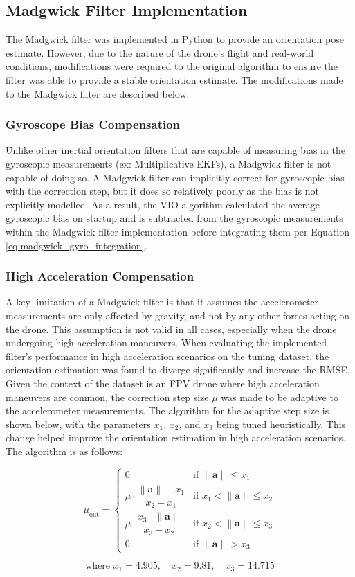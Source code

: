 \documentclass[bare_jrnl_transmag]{subfiles}
\begin{document}
\subsection{Madgwick Filter Implementation}
The Madgwick filter was implemented in Python to provide an orientation pose estimate. However, due to the nature of the drone's flight and real-world conditions, modifications were required to the original algorithm to ensure the filter was able to provide a stable orientation estimate. The modifications made to the Madgwick filter are described below. \newline

\subsubsection{Gyroscope Bias Compensation}
Unlike other inertial orientation filters that are capable of measuring bias in the gyroscopic measurements (ex: Multiplicative EKFs), a Madgwick filter is not capable of doing so. A Madgwick filter can implicitly correct for gyroscopic bias with the correction step, but it does so relatively poorly as the bias is not explicitly modelled. As a result, the VIO algorithm calculated the average gyroscopic bias on startup and is subtracted from the gyroscopic measurements within the Madgwick filter implementation before integrating them per Equation \ref{eq:madgwick_gyro_integration}. \newline

\subsubsection{High Acceleration Compensation}
A key limitation of a Madgwick filter is that it assumes the accelerometer measurements are only affected by gravity, and not by any other forces acting on the drone. This assumption is not valid in all cases, especially when the drone undergoing high acceleration maneuvers. When evaluating the implemented filter's performance in high acceleration scenarios on the tuning dataset, the orientation estimation was found to diverge significantly and increase the RMSE. Given the context of the dataset is an FPV drone where high acceleration maneuvers are common, the correction step size $\mu$ was made to be adaptive to the accelerometer measurements. The algorithm for the adaptive step size is shown below, with the parameters $x_1$, $x_2$, and $x_3$ being tuned heuristically. This change helped improve the orientation estimation in high acceleration scenarios. The algorithm is as follows:

\[
\mu_{\text{out}} =
\begin{cases}
0 & \text{if } \|\mathbf{a}\| \leq x_1 \\
\mu \cdot \dfrac{\|\mathbf{a}\| - x_1}{x_2 - x_1} & \text{if } x_1 < \|\mathbf{a}\| \leq x_2 \\
\mu \cdot \dfrac{x_3 - \|\mathbf{a}\|}{x_3 - x_2} & \text{if } x_2 < \|\mathbf{a}\| \leq x_3 \\
0 & \text{if } \|\mathbf{a}\| > x_3
\end{cases}
\]

\[
\text{where } x_1 = 4.905, \quad x_2 = 9.81, \quad x_3 = 14.715
\]
\end{document}

